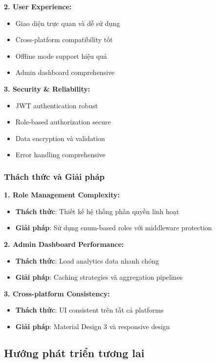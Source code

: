 \documentclass[12pt,a4paper]{article}
\begin{document}
\textbf{2. User Experience:}
\begin{itemize}
    \item Giao diện trực quan và dễ sử dụng
    \item Cross-platform compatibility tốt
    \item Offline mode support hiệu quả
    \item Admin dashboard comprehensive
\end{itemize}

\textbf{3. Security \& Reliability:}
\begin{itemize}
    \item JWT authentication robust
    \item Role-based authorization secure
    \item Data encryption và validation
    \item Error handling comprehensive
\end{itemize}

\subsubsection{Thách thức và Giải pháp}

\textbf{1. Role Management Complexity:}
\begin{itemize}
    \item \textbf{Thách thức}: Thiết kế hệ thống phân quyền linh hoạt
    \item \textbf{Giải pháp}: Sử dụng enum-based roles với middleware protection
\end{itemize}

\textbf{2. Admin Dashboard Performance:}
\begin{itemize}
    \item \textbf{Thách thức}: Load analytics data nhanh chóng
    \item \textbf{Giải pháp}: Caching strategies và aggregation pipelines
\end{itemize}

\textbf{3. Cross-platform Consistency:}
\begin{itemize}
    \item \textbf{Thách thức}: UI consistent trên tất cả platforms
    \item \textbf{Giải pháp}: Material Design 3 và responsive design
\end{itemize}

\subsection{Hướng phát triển tương lai}
\end{document}
